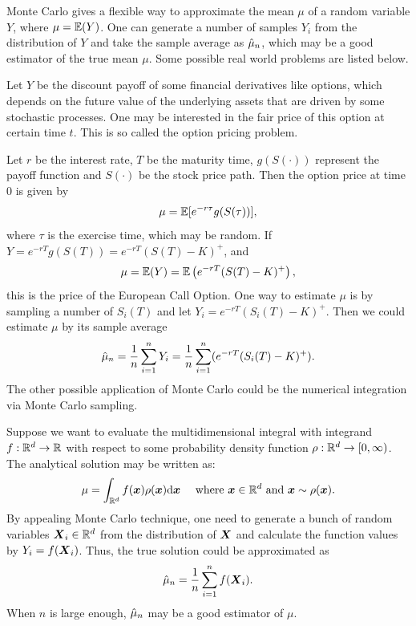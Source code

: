 \documentclass{iitthesis}
\theoremstyle{definition}
\begin{document}

Monte Carlo gives a flexible way to approximate the mean $\mu$ of a random variable $Y$, where $\mu=\mathbb{E}(Y)$. One can generate a number of samples $Y_i$ from the distribution of $Y$ and take the sample average as $\hat{\mu}_n$, which may be a good estimator of the true mean $\mu$. Some possible real world problems are listed below. 

Let $Y$ be the discount payoff of some financial derivatives like options, which depends on the future value of the underlying assets that are driven by some stochastic processes. One may be interested in the fair price of this option at certain time $t$. This is so called the option pricing problem. 

Let $r$ be the interest rate, $T$ be the maturity time, $g(S(\cdot))$ represent the payoff function and $S(\cdot)$ be the stock price path. Then the option price at time $0$ is given by $$\mu =\mathbb{E}[e^{-r\tau}g(S(\tau))],$$ 
where $\tau$ is the exercise time, which may be random. If $Y =e^{-r T}g(S(T))= e^{-rT}(S(T)-K)^+ $, and 
$$\mu=\mathbb{E}(Y)=\mathbb{E}\left(e^{-rT}(S(T)-K)^+\right),  $$
this is the price of the European Call Option. One way to estimate $\mu$ is by sampling a number of $S_i(T)$ and let $Y_i = e^{-rT}(S_i(T)-K)^+$. Then we could estimate $\mu$ by its sample average
$$\hat{\mu}_n = \frac1n\sum_{i=1}^n Y_i =\frac1n \sum_{i=1}^n( e^{-rT}(S_i(T)-K)^+).$$
The other possible application of Monte Carlo could be the numerical integration via Monte Carlo sampling.

Suppose we want to evaluate the multidimensional integral with integrand $f:\mathbb{R}^d \to \mathbb{R}$ with respect to some probability density function $\rho: \mathbb{R}^d \to [0,\infty)$.
The analytical solution may be written as:
$$\mu = \int_{\mathbb{R}^d}f(\boldsymbol{x})\rho(\boldsymbol{x}){\rm d}\boldsymbol{x} \quad \text{   where } \boldsymbol{x} \in \mathbb{R}^d \text{ and } \boldsymbol{x} \sim \rho(\boldsymbol{x}).$$
By appealing Monte Carlo technique, one need to generate a bunch of random variables $\boldsymbol{X}_i \in \mathbb{R}^d$ from the distribution of $\boldsymbol{X}$ and calculate the function values by $Y_i = f(\boldsymbol{X}_i)$. Thus, the true solution could be approximated as $$\hat{\mu}_n = \frac1n\sum_{i=1}^n f(\boldsymbol{X}_i).$$
When $n$ is large enough, $\hat{\mu}_n$ may be a good estimator of $\mu$.
\end{document}
